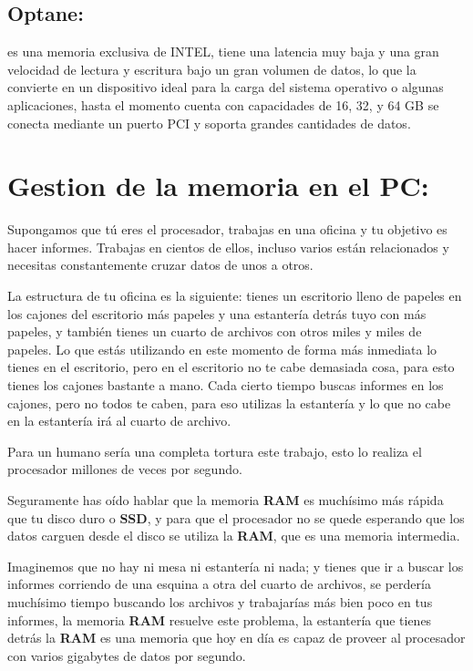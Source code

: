 \documentclass{article}
\begin{document}
\subsection{Optane:} es una memoria exclusiva de INTEL, tiene una latencia muy baja y una gran velocidad de lectura y escritura bajo un gran volumen de datos, lo que la convierte en un dispositivo ideal para la carga del sistema operativo o algunas aplicaciones, hasta el momento cuenta con capacidades de 16, 32, y 64 GB se conecta mediante un puerto PCI y soporta grandes cantidades de datos.\cite{uaslpwebsite}

\section{Gestion de la memoria en el PC:}

Supongamos que tú eres el procesador, trabajas en una oficina y tu objetivo es hacer informes. Trabajas en cientos de ellos, incluso varios están relacionados y necesitas constantemente cruzar datos de unos a otros.

\vspace{0.5cm}

La estructura de tu oficina es la siguiente: tienes un escritorio lleno de papeles en los cajones del escritorio más papeles y una estantería detrás tuyo con más papeles, y también tienes un cuarto de archivos con otros miles y miles de papeles. Lo que estás utilizando en este momento de forma más inmediata lo tienes en el escritorio, pero en el escritorio no te cabe demasiada cosa, para esto tienes los cajones bastante a mano. Cada cierto tiempo buscas informes en los cajones, pero no todos te caben, para eso utilizas la estantería y lo que no cabe en la estantería irá al cuarto de archivo. 

\vspace{0.5cm}

Para un humano sería una completa tortura este trabajo, esto lo realiza el procesador millones de veces por segundo. 

\vspace{0.5cm}

Seguramente has oído hablar que la memoria \textbf{RAM} es muchísimo más rápida que tu disco duro o \textbf{SSD}, y para que el procesador no se quede esperando que los datos carguen desde el disco se utiliza la \textbf{RAM}, que es una memoria intermedia.

\vspace{0.5cm}

Imaginemos que no hay ni mesa ni estantería ni nada; y tienes que ir a buscar los informes corriendo de una esquina a otra del cuarto de archivos, se perdería muchísimo tiempo buscando los archivos y trabajarías más bien poco en tus informes, la memoria \textbf{RAM} resuelve este problema, la estantería que tienes detrás la \textbf{RAM} es una memoria que hoy en día es capaz de proveer al procesador con varios gigabytes de datos por segundo.
\end{document}
